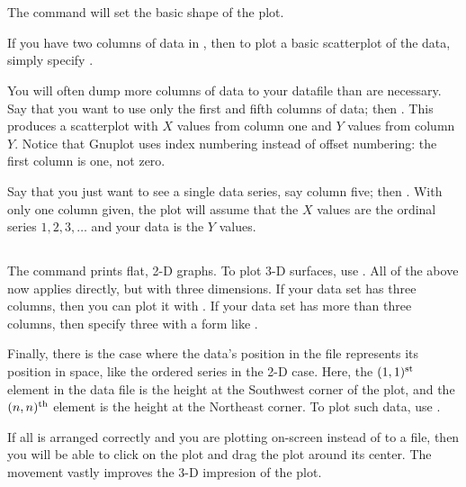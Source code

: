 \section{} The  command will set the basic shape of
the plot. 

If you have two columns of data in , then to plot a basic
scatterplot of the data, simply specify . 

You will often dump more columns of data to your datafile than are
necessary. Say that you want to use only the first and fifth columns of
data; then . This produces a scatterplot
with $X$ values from column one and $Y$ values from column $Y$.
Notice that Gnuplot uses index numbering instead of offset numbering:
the first column is one, not zero.

Say that you just want to see a single data series, say column five; then 
. With only one column given, the plot will
assume that the $X$ values are the ordinal series $1, 2, 3, \dots$ and
your data is the $Y$ values.

\subsection{} The  command prints flat, 2-D graphs.
To plot 3-D surfaces, use . All of the above now applies
directly, but with three dimensions. If your data set has three columns, then
you can plot it with . If your data set has more
than three columns, then specify three with a form like . 

Finally, there is the case where the data's  position in the file
represents its position in space, like the ordered series in the 2-D
case. Here, the $(1,1)^{\rm st}$ element in the data file is the
height at the Southwest corner of the plot, and the $(n,n)^{\rm th}$
element is the height at the Northeast corner. To plot such data, use
.

If all is arranged correctly and you are plotting on-screen instead of
to a file, then you will be able to click on the plot and drag the plot
around its center. The movement vastly improves the 3-D impresion of the plot.

